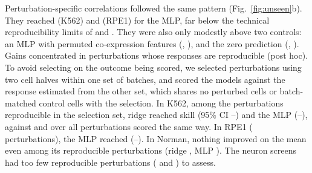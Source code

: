 Perturbation-specific correlations followed the same pattern (Fig.~\ref{fig:unseen}b). They reached \numSpecReplogleKEssentialMlpEnsemble{} (K562) and \numSpecReplogleRpeMlpEnsemble{} (RPE1) for the MLP, far below the technical reproducibility limits of \numCeilBatchReplogleKEssential{} and \numCeilBatchReplogleRpe. They were also only modestly above two controls: an MLP with permuted co-expression features (\numShufSpecReplogleKEssentialMlpEnsemble, \numShufSpecReplogleRpeMlpEnsemble), and the zero prediction (\numZeroSpecReplogleKEssential, \numZeroSpecReplogleRpe). Gains concentrated in perturbations whose responses are reproducible (post hoc). To avoid selecting on the outcome being scored, we selected perturbations using two cell halves within one set of batches, and scored the models against the response estimated from the other set, which shares no perturbed cells or batch-matched control cells with the selection. In K562, among the \numRiNReplogleKEssentialRidgeRep{} perturbations reproducible in the selection set, ridge reached skill \numRiSkillReplogleKEssentialRidgeRep{} (95\% CI \numRiLoReplogleKEssentialRidgeRep--\numRiHiReplogleKEssentialRidgeRep) and the MLP \numRiSkillReplogleKEssentialMlpEnsembleRep{} (\numRiLoReplogleKEssentialMlpEnsembleRep--\numRiHiReplogleKEssentialMlpEnsembleRep), against \numRiSkillReplogleKEssentialRidgeAll{} and \numRiSkillReplogleKEssentialMlpEnsembleAll{} over all perturbations scored the same way. In RPE1 (\numRiNReplogleRpeMlpEnsembleRep{} perturbations), the MLP reached \numRiSkillReplogleRpeMlpEnsembleRep{} (\numRiLoReplogleRpeMlpEnsembleRep--\numRiHiReplogleRpeMlpEnsembleRep). In Norman, nothing improved on the mean even among its \numRiNNormanRidgeRep{} reproducible perturbations (ridge \numRiSkillNormanRidgeRep, MLP \numRiSkillNormanMlpEnsembleRep). The neuron screens had too few reproducible perturbations (\numRiNTianCrispraRidgeRep{} and \numRiNTianCrispriRidgeRep) to assess.

